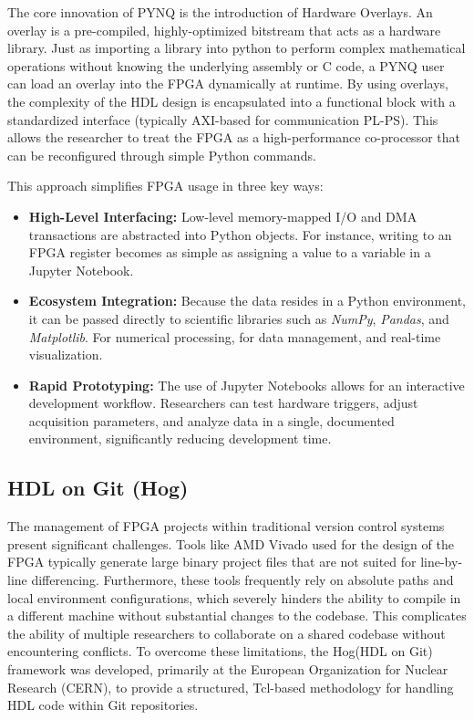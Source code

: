 The core innovation of PYNQ is the introduction of Hardware Overlays. An overlay is a pre-compiled, highly-optimized bitstream that acts as a hardware library. Just as importing a library into python to perform complex mathematical operations without knowing the underlying assembly or C code, a PYNQ user can load an overlay into the FPGA dynamically at runtime. By using overlays, the complexity of the HDL design is encapsulated into a functional block with a standardized interface (typically AXI-based for communication PL-PS). This allows the researcher to treat the FPGA as a high-performance co-processor that can be reconfigured through simple Python commands.


This approach simplifies FPGA usage in three key ways:
\begin{itemize}
\item \textbf{High-Level Interfacing:} Low-level memory-mapped I/O and DMA transactions are abstracted into Python objects. For instance, writing to an FPGA register becomes as simple as assigning a value to a variable in a Jupyter Notebook.
\item \textbf{Ecosystem Integration:} Because the data resides in a Python environment, it can be passed directly to scientific libraries such as \textit{NumPy}, \textit{Pandas}, and \textit{Matplotlib}. For numerical processing, for data management, and real-time visualization.
\item \textbf{Rapid Prototyping:} The use of Jupyter Notebooks allows for an interactive development workflow. Researchers can test hardware triggers, adjust acquisition parameters, and analyze data in a single, documented environment, significantly reducing development time.
\end{itemize}





\subsection{HDL on Git (Hog)}
The management of FPGA projects within traditional version control systems present significant challenges. Tools like AMD Vivado used for the design of the FPGA typically generate large binary project files that are not suited for line-by-line differencing. Furthermore, these tools frequently rely on absolute paths and local environment configurations, which severely hinders the ability to compile in a different machine without substantial changes to the codebase. This complicates the ability of multiple researchers to collaborate on a shared codebase without encountering conflicts. To overcome these limitations, the Hog(HDL on Git) framework \cite{HogHogGitLab2026} was developed, primarily at the European Organization for Nuclear Research (CERN), to provide a structured, Tcl-based methodology for handling HDL code within Git repositories. 

